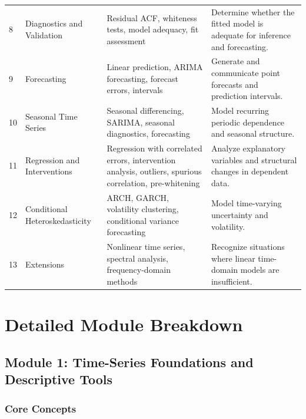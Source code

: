 \documentclass[11pt]{article}
\begin{document}
\begin{longtable}{p{} p{} p{} p{}}
8 & Diagnostics and Validation &
Residual ACF, whiteness tests, model adequacy, fit assessment &
Determine whether the fitted model is adequate for inference and forecasting. \\

9 & Forecasting &
Linear prediction, ARIMA forecasting, forecast errors, intervals &
Generate and communicate point forecasts and prediction intervals. \\

10 & Seasonal Time Series &
Seasonal differencing, SARIMA, seasonal diagnostics, forecasting &
Model recurring periodic dependence and seasonal structure. \\

11 & Regression and Interventions &
Regression with correlated errors, intervention analysis, outliers,
spurious correlation, pre-whitening &
Analyze explanatory variables and structural changes in dependent data. \\

12 & Conditional Heteroskedasticity &
ARCH, GARCH, volatility clustering, conditional variance forecasting &
Model time-varying uncertainty and volatility. \\

13 & Extensions &
Nonlinear time series, spectral analysis, frequency-domain methods &
Recognize situations where linear time-domain models are insufficient. \\

\bottomrule
\end{longtable}

\section{Detailed Module Breakdown}

\subsection{Module 1: Time-Series Foundations and Descriptive Tools}

\subsubsection{Core Concepts}
\end{document}
